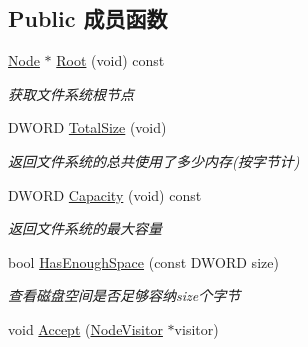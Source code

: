 \subsection*{Public 成员函数}
\begin{DoxyCompactItemize}
\item 
\hyperlink{class_file_sys_1_1_node}{Node} $\ast$ \hyperlink{class_file_sys_1_1_file_system_aa5a55cf06f8ec0ba9d75c958a6cf8f12}{Root} (void) const 
\begin{DoxyCompactList}\small\item\em 获取文件系统根节点 \end{DoxyCompactList}\item 
\hypertarget{class_file_sys_1_1_file_system_a2b5ce6823a73ad89b242cae7d5bf4329}{D\-W\-O\-R\-D \hyperlink{class_file_sys_1_1_file_system_a2b5ce6823a73ad89b242cae7d5bf4329}{Total\-Size} (void)}\label{class_file_sys_1_1_file_system_a2b5ce6823a73ad89b242cae7d5bf4329}

\begin{DoxyCompactList}\small\item\em 返回文件系统的总共使用了多少内存(按字节计) \end{DoxyCompactList}\item 
\hypertarget{class_file_sys_1_1_file_system_a8f0fe8f9969ac37e840a383f370d46fc}{D\-W\-O\-R\-D \hyperlink{class_file_sys_1_1_file_system_a8f0fe8f9969ac37e840a383f370d46fc}{Capacity} (void) const }\label{class_file_sys_1_1_file_system_a8f0fe8f9969ac37e840a383f370d46fc}

\begin{DoxyCompactList}\small\item\em 返回文件系统的最大容量 \end{DoxyCompactList}\item 
\hypertarget{class_file_sys_1_1_file_system_af4c767aeb58c230de141030126271457}{bool \hyperlink{class_file_sys_1_1_file_system_af4c767aeb58c230de141030126271457}{Has\-Enough\-Space} (const D\-W\-O\-R\-D size)}\label{class_file_sys_1_1_file_system_af4c767aeb58c230de141030126271457}

\begin{DoxyCompactList}\small\item\em 查看磁盘空间是否足够容纳size个字节 \end{DoxyCompactList}\item 
\hypertarget{class_file_sys_1_1_file_system_aca5e8be14a15b85123290426ae39eb3b}{void \hyperlink{class_file_sys_1_1_file_system_aca5e8be14a15b85123290426ae39eb3b}{Accept} (\hyperlink{class_file_sys_1_1_node_visitor}{Node\-Visitor} $\ast$visitor)}\label{class_file_sys_1_1_file_system_aca5e8be14a15b85123290426ae39eb3b}


\end{DoxyCompactItemize}
